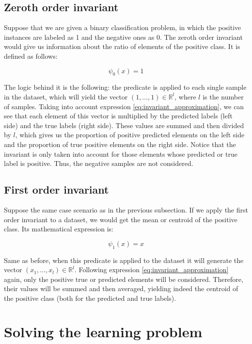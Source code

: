 \subsection{Zeroth order invariant}

Suppose that we are given a binary classification problem, in which the positive instances
are labeled as 1 and the negative ones as 0. The zeroth order invariant would give us information
about the ratio of elements of the positive class. It is defined as follows:

\[
    \psi_0(x) = 1
\]

The logic behind it is the following: the predicate is applied to each single sample in the dataset,
which will yield the vector $(1, \dots, 1) \in \mathbb{R}^l $, where $l$ is the number of samples. Taking into account
expression \eqref{eq:invariant_approximation}, we can see that each element of this vector is multiplied
by the predicted labels (left side) and the true labels (right side). These values are summed and then divided
by $l$, which gives us the proportion of positive predicted elements on the left side and the proportion
of true positive elements on the right side. Notice that the invariant is only taken into account for those
elements whose predicted or true label is positive. Thus, the negative samples are not considered.

\subsection{First order invariant}

Suppose the same case scenario as in the previous subsection. If we apply the first order invariant to
a dataset, we would get the mean or centroid of the positive class. Its mathematical expression is:

\[
    \psi_1(x) = x
\]

Same as before, when this predicate is applied to the dataset it will generate the vector
$(x_1, \dots, x_l) \in \mathbb{R}^l$. Following expression \eqref{eq:invariant_approximation} again,
only the positive true or predicted elements will be considered. Therefore, their values will be summed and
then averaged, yielding indeed the centroid of the positive class (both for the predicted and true labels).

\section{Solving the learning problem}
\label{sect:solvin_learning_problem}

